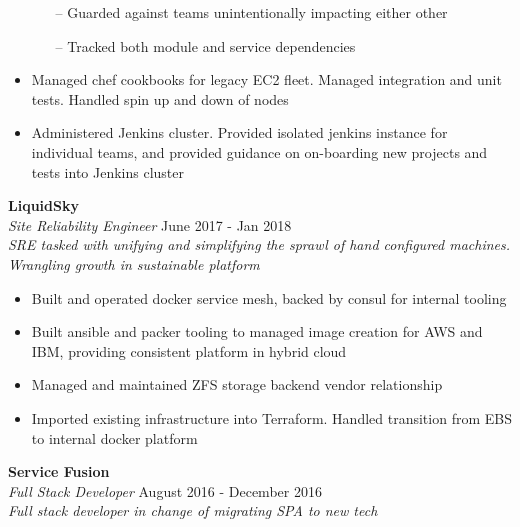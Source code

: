 \begin{minipage}[t]{\linewidth}
\begin{itemize}
\begin{itemize}
        \item[--] Guarded against teams unintentionally impacting either other
        \item[--] Tracked both module and service dependencies
      \end{itemize}
    \item Managed chef cookbooks for legacy EC2 fleet. Managed integration and unit tests. Handled spin up and down of nodes
    \item Administered Jenkins cluster. Provided isolated jenkins instance for individual teams, and provided guidance on on-boarding new projects and tests into Jenkins cluster
  \end{itemize}
\end{minipage}


\large{\textbf{LiquidSky}} \\
\textit{Site Reliability Engineer} \hfill June 2017 - Jan 2018 \\[3.75pt]
\textit{SRE tasked with unifying and simplifying the sprawl of hand configured machines. Wrangling growth in sustainable platform}

\begin{minipage}[t]{\linewidth}
  \begin{itemize}
    \item Built and operated docker service mesh, backed by consul for internal tooling
    \item Built ansible and packer tooling to managed image creation for AWS and IBM, providing consistent platform in hybrid cloud
    \item Managed and maintained ZFS storage backend vendor relationship
    \item Imported existing infrastructure into Terraform. Handled transition from EBS to internal docker platform
  \end{itemize}
\end{minipage}

\large{\textbf{Service Fusion}} \\
\textit{Full Stack Developer} \hfill August 2016 - December 2016 \\[3.75pt]
\textit{Full stack developer in change of migrating SPA to new tech}

